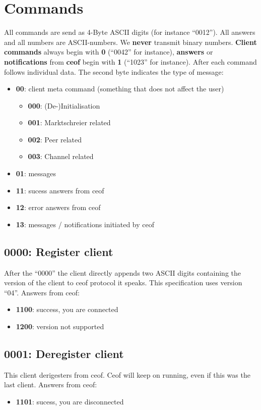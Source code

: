 \documentclass[12pt,a4paper]{book}
\begin{document}
\section{Commands}
All commands are send as 4-Byte ASCII digits (for instance "`0012"').
All answers and all numbers are ASCII-numbers. We
\textbf{never} transmit binary numbers.
\textbf{Client commands} always begin with \textbf{0} ("`0042"' for instance),
\textbf{answers} or \textbf{notifications} from
\textbf{ceof} begin with \textbf{1} ("`1023"' for instance).
After each command follows individual data. The second byte indicates the type of message:
\begin{itemize}
\item \textbf{00}: client meta command (something that does not affect the user)
\begin{itemize}
\item \textbf{000}: (De-)Initialisation
\item \textbf{001}: Marktschreier related
\item \textbf{002}: Peer related
\item \textbf{003}: Channel related
\end{itemize}
\item \textbf{01}: messages
\item \textbf{11}: sucess answers from ceof
\item \textbf{12}: error answers from ceof
\item \textbf{13}: messages / notifications initiated by ceof
\end{itemize}

\subsection{0000: Register client}
After the "`0000"' the client directly appends two ASCII digits containing the
version of the client to ceof protocol it speaks. This specification uses version
"`04"'.
Answers from ceof:
\begin{itemize}
\item \textbf{1100}: success, you are connected
\item \textbf{1200}: version not supported
\end{itemize}
\subsection{0001: Deregister client}
This client derigesters from ceof. Ceof will keep on running, even if this
was the last client.
Answers from ceof:
\begin{itemize}
\item \textbf{1101}: sucess, you are disconnected
\end{itemize}
\end{document}
